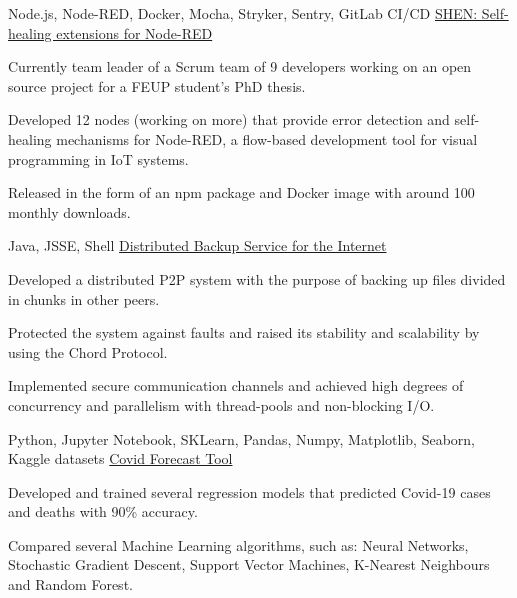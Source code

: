 
\begin{cventries}

  \cventry
  {Node.js, Node-RED, Docker, Mocha, Stryker, Sentry, GitLab CI/CD} %
  {\href{https://flows.nodered.org/node/node-red-contrib-self-healing}{SHEN: Self-healing extensions for Node-RED \faExternalLink}} %
  {} %
  {} %
  {
    \begin{cvitems} %
      \item {Currently team leader of a Scrum team of 9 developers working on an open source project for a FEUP student's PhD thesis.}
      \item {Developed 12 nodes (working on more) that provide error detection and self-healing mechanisms for Node-RED, a flow-based development tool for visual programming in IoT systems.}
      \item {Released in the form of an npm package and Docker image with around 100 monthly downloads.}
    \end{cvitems}
  }

  \cventry
  {Java, JSSE, Shell} %
  {\href{https://github.com/MiguelDelPinto/distributed-backup-service/tree/master/proj2}{Distributed Backup Service for the Internet \faExternalLink}} %
  {} %
  {} %
  {
    \begin{cvitems} %
      \item {Developed a distributed P2P system with the purpose of backing up files divided in chunks in other peers.}
      \item {Protected the system against faults and raised its stability and scalability by using the Chord Protocol.}
      \item {Implemented secure communication channels and achieved high degrees of concurrency and parallelism with thread-pools and non-blocking I/O.}
    \end{cvitems}
  }

  \cventry
  {Python, Jupyter Notebook, SKLearn, Pandas, Numpy, Matplotlib, Seaborn, Kaggle datasets} %
  {\href{https://github.com/MiguelDelPinto/feup-iart/tree/master/proj2}{Covid Forecast Tool \faExternalLink}} %
  {} %
  {} %
  {
    \begin{cvitems} %
      \item {Developed and trained several regression models that predicted Covid-19 cases and deaths with 90\% accuracy.}
      \item {Compared several Machine Learning algorithms, such as: Neural Networks, Stochastic Gradient Descent, Support Vector Machines, K-Nearest Neighbours and Random Forest.}
    \end{cvitems}
  }

\end{cventries}
